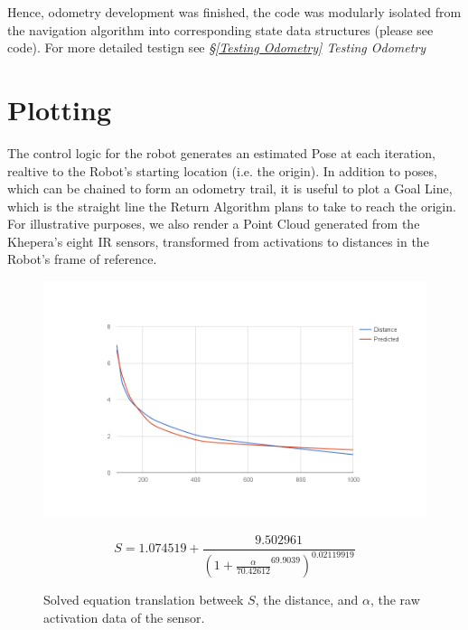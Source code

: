 \documentclass[11pt, a4paper]{article}
\begin{document}
Hence, odometry development was finished, the code was modularly isolated from the navigation algorithm 
into corresponding state data structures (please see code). For more detailed testign see 
\textit{\S\ref{Testing Odometry} Testing Odometry}




\section{Plotting}
\label{Plotting}

The control logic for the robot generates an estimated Pose at each iteration, realtive to the 
Robot's starting location (i.e. the origin). In addition to poses, which can be chained to 
form an odometry trail, it is useful to plot a Goal Line, which is the straight line the 
Return Algorithm plans to take to reach the origin. For illustrative purposes, we also render
a Point Cloud generated from the Khepera's eight IR sensors, transformed from activations
to distances in the Robot's frame of reference.

\begin{figure}[h]
  \begin{center}
    \includegraphics[width=32em]{../assets/plots/sensor-equation.png}
  \end{center}
  \begin{equation}
    S = 1.074519 + 
    \frac{9.502961}
         {(1 + \frac{\alpha}{70.42612}^{69.9039})^{0.02119919}}
  \end{equation}
  \caption{Solved equation translation betweek $S$, the distance, and $\alpha$, 
    the raw activation data of the sensor.}
\end{figure}


\end{document}
